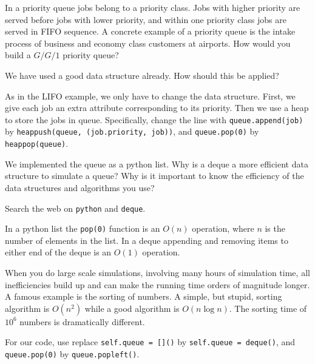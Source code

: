 \documentclass{scrartcl}
\begin{document}
\begin{exercise}
  In a priority queue  jobs belong to a priority class. Jobs with higher priority are served before jobs with lower priority, and within one priority class jobs are served in FIFO sequence. A concrete example of a priority queue is the intake process of business and economy class customers at airports.  How would you build a $G/G/1$ priority queue?
  \hintsymbol\begin{hint}
We have used a good data structure already. How should this be applied?
  \end{hint}
\begin{solution}
  As in the LIFO example, we only have to change the data structure. First, we give each job an extra attribute corresponding to its priority. Then we use a heap to store the jobs in queue. Specifically,  change the line with
\texttt{queue.append(job)} by \texttt{heappush(queue, (job.priority, job))}, and \texttt{queue.pop(0)} by \texttt{heappop(queue)}. 

\end{solution}
\end{exercise}

\begin{exercise}

  We implemented the queue as a python list. Why is a deque a more efficient data structure to simulate a queue?  Why is it important to know the efficiency of the data structures and algorithms you use?
  \hintsymbol\begin{hint}
  Search the web on \texttt{python} and \texttt{deque}.
  \end{hint}
  \begin{solution}
    In a python list the \texttt{pop(0)} function is an $O(n)$ operation, where $n$ is the number of elements in the list. In a deque appending and removing items to either end of the deque is an $O(1)$ operation.

When you do large scale simulations, involving many hours of simulation time, all inefficiencies build up and can make the running time orders of magnitude longer. A famous example is the sorting of numbers. A simple, but stupid, sorting algorithm is $O(n^2)$ while a good algorithm is $O(n \log n)$. The sorting time of $10^6$ numbers is dramatically different. 

    For our code, use replace \texttt{self.queue = []()} by \texttt{self.queue = deque()},   and \texttt{queue.pop(0)}  by \texttt{queue.popleft()}.
  \end{solution}
\end{exercise}
\end{document}
